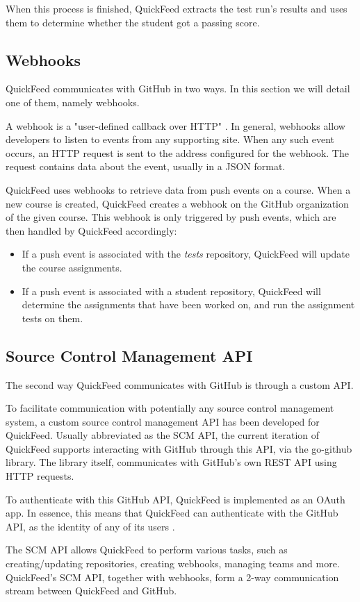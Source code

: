 When this process is finished, QuickFeed extracts the test run's results and uses them to determine whether the student got a passing score.

\subsection{Webhooks}
\label{sec:webhooks}

QuickFeed communicates with GitHub in two ways.
In this section we will detail one of them, namely webhooks.

A webhook is a "user-defined callback over HTTP" \cite{webhook}. 
In general, webhooks allow developers to listen to events from any supporting site.
When any such event occurs, an HTTP request is sent to the address configured for the webhook.
The request contains data about the event, usually in a JSON format.

QuickFeed uses webhooks to retrieve data from push events on a course.
When a new course is created, QuickFeed creates a webhook on the GitHub organization of the given course.
This webhook is only triggered by push events, which are then handled by QuickFeed accordingly:

\begin{itemize}
    \item If a push event is associated with the \textit{tests} repository, QuickFeed will update the course assignments.
    \item If a push event is associated with a student repository, QuickFeed will determine the assignments that have been worked on,
    and run the assignment tests on them.
\end{itemize}

\subsection{Source Control Management API}

The second way QuickFeed communicates with GitHub is through a custom API.

To facilitate communication with potentially any source control management system, a custom source control management API has been developed for QuickFeed.
Usually abbreviated as the SCM API, the current iteration of QuickFeed supports interacting with GitHub through this API, via the go-github library.
The library itself, communicates with GitHub's own REST API using HTTP requests.

To authenticate with this GitHub API, QuickFeed is implemented as an OAuth app.
In essence, this means that QuickFeed can authenticate with the GitHub API, as the identity of any of its users \cite{apps}.

The SCM API allows QuickFeed to perform various tasks, such as creating/updating repositories, creating webhooks, managing teams and more.
QuickFeed's SCM API, together with webhooks, form a 2-way communication stream between QuickFeed and GitHub.